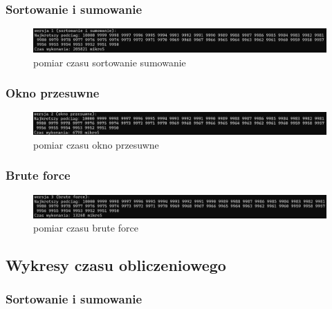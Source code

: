 \documentclass[12pt,twoside]{article}
\begin{document}
\subsubsection{Sortowanie i sumowanie}

\begin{figure}[!h]
    \centering
    \includegraphics[width=1\linewidth]{czas1.png}
    \caption{pomiar czasu sortowanie sumowanie}
    \label{fig:enter-label}
\end{figure}

\subsubsection{Okno przesuwne}

\begin{figure}[!h]
    \centering
    \includegraphics[width=1\linewidth]{czas2.png}
    \caption{pomiar czasu okno przesuwne}
    \label{fig:enter-label}
\end{figure}

\subsubsection{Brute force}

\begin{figure}[!h]
    \centering
    \includegraphics[width=1\linewidth]{czas3.png}
    \caption{pomiar czasu brute force}
    \label{fig:enter-label}
\end{figure}

\subsection{Wykresy czasu obliczeniowego}

\subsubsection{Sortowanie i sumowanie}
\end{document}
